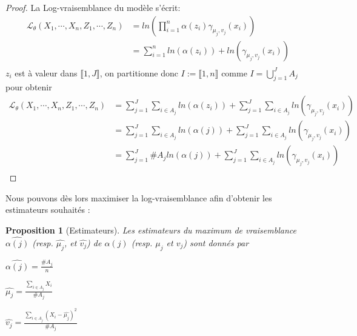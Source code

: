 \documentclass[frenchb]{report}
\newcommand{\1}{\mathbbm{1}}
\newtheorem{prop}{Proposition}
\theoremstyle{definition}\newtheorem{defn}{Définition}
\theoremstyle{definition}\newtheorem{exm}{Exemple}
\theoremstyle{definition}\newtheorem{nota}{Notation}
\theoremstyle{definition}\newtheorem{rem}{Remarque}
\begin{document}
\begin{proof}
La Log-vraisemblance du modèle s'écrit:
\begin{align*}
\mathcal{L}_\theta(X_1, \cdots, X_n, Z_1, \cdots, Z_n) &= ln\left(\displaystyle\prod_{i=1}^n  \alpha(z_i)\gamma_{\mu_j, v_j}(x_i) \right)\\
&= \displaystyle\sum_{i=1}^n ln(\alpha(z_i))+ ln(\gamma_{\mu_j, v_j}(x_i))\\
\end{align*}
$z_i$ est à valeur dans $\llbracket1,J \rrbracket$, on  partitionne donc $I := \llbracket1,n \rrbracket$ comme $I = \displaystyle\bigcup_{j=1}^J A_j$ pour obtenir
\begin{align*}
\mathcal{L}_\theta(X_1, \cdots, X_n, Z_1, \cdots, Z_n) &=  \displaystyle\sum_{j=1}^J\sum_{i\in A_j} ln(\alpha(z_i))+ \sum_{j=1}^J\sum_{i\in A_j} ln(\gamma_{\mu_j, v_j}(x_i))\\
&= \displaystyle\sum_{j=1}^J\sum_{i\in A_j} ln(\alpha(j))+ \sum_{j=1}^J\sum_{i\in A_j} ln(\gamma_{\mu_j, v_j}(x_i)) \\
&= \displaystyle\sum_{j=1}^J \#A_j ln(\alpha(j))+ \sum_{j=1}^J\sum_{i\in A_j} ln(\gamma_{\mu_j, v_j}(x_i)) \\
\end{align*}
\end{proof}
Nous pouvons dès lors maximiser la log-vraisemblance afin d'obtenir les estimateurs souhaités :
\begin{prop}[Estimateurs]
Les estimateurs du maximum de vraisemblance $\hat{\alpha(j)}$ (resp. $\hat{\mu_j}$, et $\hat{v_j}$) de $\alpha(j)$ (resp. $\mu_j$ et $v_j$) sont donnés par
\begin{center}
$\hat{\alpha(j)} = \frac{\#A_j}{n}$
\end{center}
\begin{center}
$ \hat{\mu_j} = \displaystyle\frac{\sum_{i\in A_j} X_i}{\#A_j} $
\end{center}
\begin{center}
$ \hat{v_j} = \displaystyle \frac{\sum_{i\in A_j}(X_i - \hat{\mu_j})^2}{\#A_j}$
\end{center}
\end{prop}
\end{document}
